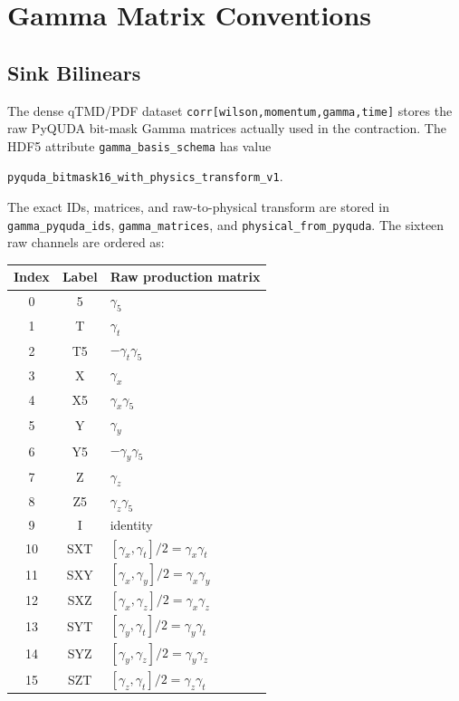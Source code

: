 \documentclass[11pt,a4paper]{article}
\begin{document}
\section{Gamma Matrix Conventions}

\subsection{Sink Bilinears}

The dense qTMD/PDF dataset
\texttt{corr[wilson,momentum,gamma,time]} stores the raw PyQUDA bit-mask
Gamma matrices actually used in the contraction.  The HDF5 attribute
\texttt{gamma\_basis\_schema} has value
\begin{center}
\texttt{pyquda\_bitmask16\_with\_physics\_transform\_v1}.
\end{center}
The exact IDs, matrices, and raw-to-physical transform are stored in
\texttt{gamma\_pyquda\_ids}, \texttt{gamma\_matrices}, and
\texttt{physical\_from\_pyquda}.  The sixteen raw channels are ordered as:

\begin{center}
  \begin{tabular}{c|c|l}
    Index & Label & Raw production matrix \\
    \hline
    0  & 5   & $\gamma_5$ \\
    1  & T   & $\gamma_t$ \\
    2  & T5  & $-\gamma_t\gamma_5$ \\
    3  & X   & $\gamma_x$ \\
    4  & X5  & $\gamma_x\gamma_5$ \\
    5  & Y   & $\gamma_y$ \\
    6  & Y5  & $-\gamma_y\gamma_5$ \\
    7  & Z   & $\gamma_z$ \\
    8  & Z5  & $\gamma_z\gamma_5$ \\
    9  & I   & identity \\
    10 & SXT & $[\gamma_x,\gamma_t]/2=\gamma_x\gamma_t$ \\
    11 & SXY & $[\gamma_x,\gamma_y]/2=\gamma_x\gamma_y$ \\
    12 & SXZ & $[\gamma_x,\gamma_z]/2=\gamma_x\gamma_z$ \\
    13 & SYT & $[\gamma_y,\gamma_t]/2=\gamma_y\gamma_t$ \\
    14 & SYZ & $[\gamma_y,\gamma_z]/2=\gamma_y\gamma_z$ \\
    15 & SZT & $[\gamma_z,\gamma_t]/2=\gamma_z\gamma_t$
  \end{tabular}
\end{center}
\end{document}

